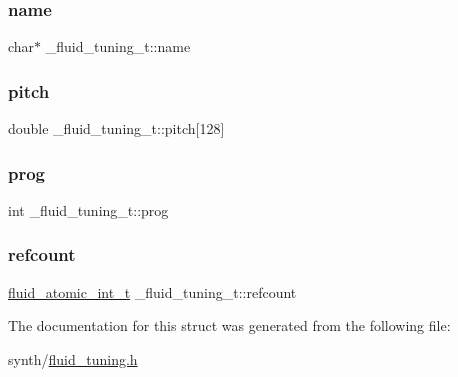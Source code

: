 \subsubsection{\texorpdfstring{name}{name}}
{\footnotesize\ttfamily char$\ast$ \+\_\+fluid\+\_\+tuning\+\_\+t\+::name}

\mbox{\label{struct__fluid__tuning__t_aa6a64e8c5fe6cbed8f73a1957719b275}} 
\subsubsection{\texorpdfstring{pitch}{pitch}}
{\footnotesize\ttfamily double \+\_\+fluid\+\_\+tuning\+\_\+t\+::pitch\mbox{[}128\mbox{]}}

\mbox{\label{struct__fluid__tuning__t_a6770e4bf001805e39c0d84bb2a5b1f4b}} 
\subsubsection{\texorpdfstring{prog}{prog}}
{\footnotesize\ttfamily int \+\_\+fluid\+\_\+tuning\+\_\+t\+::prog}

\mbox{\label{struct__fluid__tuning__t_a234f93b6e2b0d24327fecf44c997bdbb}} 
\subsubsection{\texorpdfstring{refcount}{refcount}}
{\footnotesize\ttfamily \hyperlink{fluidsynth__priv_8h_a6b8be882dd9958ea3635a868e1bf5152}{fluid\+\_\+atomic\+\_\+int\+\_\+t} \+\_\+fluid\+\_\+tuning\+\_\+t\+::refcount}



The documentation for this struct was generated from the following file\+:\begin{DoxyCompactItemize}
\item 
synth/\hyperlink{fluid__tuning_8h}{fluid\+\_\+tuning.\+h}\end{DoxyCompactItemize}
